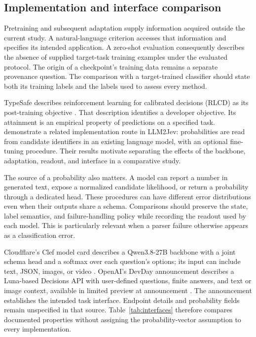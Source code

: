 \documentclass[11pt,a4paper]{article}
\begin{document}
\subsection{Implementation and interface comparison}

Pretraining and subsequent adaptation supply information acquired outside the current study. A natural-language criterion accesses that information and specifies its intended application. A zero-shot evaluation consequently describes the absence of supplied target-task training examples under the evaluated protocol. The origin of a checkpoint's training data remains a separate provenance question. The comparison with a target-trained classifier should state both its training labels and the labels used to assess every method.

TypeSafe describes reinforcement learning for calibrated decisions (RLCD) as its post-training objective \citep{typesafe-primer}. That description identifies a developer objective. Its attainment is an empirical property of predictions on a specified task. \citet{liwagle2026} demonstrate a related implementation route in LLM2Jev: probabilities are read from candidate identifiers in an existing language model, with an optional fine-tuning procedure. Their results motivate separating the effects of the backbone, adaptation, readout, and interface in a comparative study.

The source of a probability also matters. A model can report a number in generated text, expose a normalized candidate likelihood, or return a probability through a dedicated head. These procedures can have different error distributions even when their outputs share a schema. Comparisons should preserve the state, label semantics, and failure-handling policy while recording the readout used by each model. This is particularly relevant when a parser failure otherwise appears as a classification error.

Cloudflare's Clef model card describes a Qwen3.8-27B backbone with a joint schema head and a softmax over each question's options; its input can include text, JSON, images, or video \citep{cloudflare2026}. OpenAI's DevDay announcement describes a Luna-based Decisions API with user-defined questions, finite answers, and text or image context, available in limited preview at announcement \citep{openai2026}. The announcement establishes the intended task interface. Endpoint details and probability fields remain unspecified in that source. Table~\ref{tab:interfaces} therefore compares documented properties without assigning the probability-vector assumption to every implementation.
\end{document}
